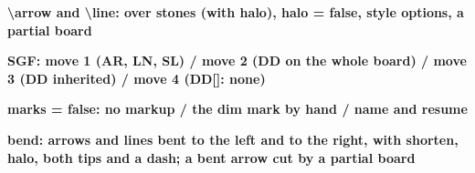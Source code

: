 \documentclass{article}
\newcommand\case[1]{\par\medskip\noindent\textbf{#1}\par\nopagebreak}
\begin{document}

\case{\textbackslash arrow and \textbackslash line: over stones (with halo), halo = false, style options, a partial board}
\begin{goban}[9]
\end{goban}
\begin{goban}[9, partial = A1:E5]
\end{goban}
{%
\begin{goban}[5]\end{goban}}

\case{SGF: move 1 (AR, LN, SL) / move 2 (DD on the whole board) / move 3 (DD inherited) / move 4 (DD[]: none)}
\begin{goban}[9]\end{goban}
\begin{goban}[9]\end{goban}
\begin{goban}[9]\end{goban}
\begin{goban}[9]\end{goban}

\case{marks = false: no markup / the dim mark by hand / name and resume}
\begin{goban}[9]\end{goban}
\begin{goban}[9]\end{goban}
\begin{goban}[5, name = markup]\end{goban}
\begin{goban}[5, resume = {markup, marks}]\end{goban}

\case{bend: arrows and lines bent to the left and to the right, with shorten, halo, both tips and a dash; a bent arrow cut by a partial board}
\begin{goban}[5]
\end{goban}
\begin{goban}[9, partial = A1:E5]
\end{goban}
{%
\begin{goban}[5]\end{goban}}
\end{document}
